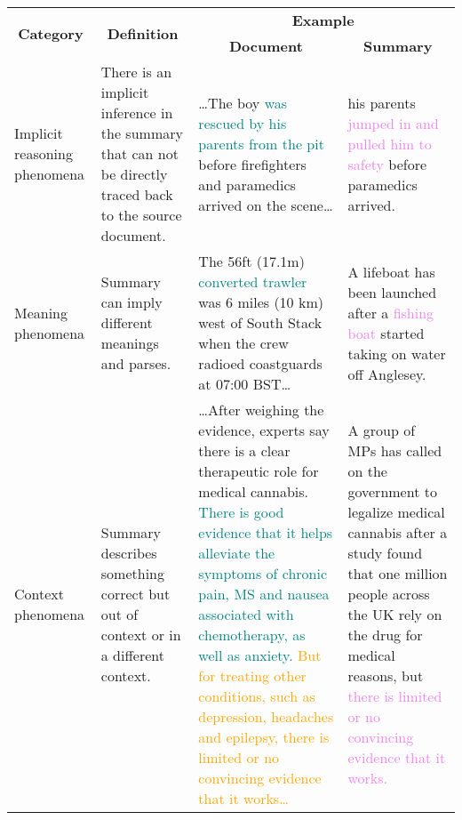\begin{table*}
\small
\centering
\begin{tabular}{@{}p{2.1cm}p{3cm}p{5.8cm}p{3.5cm}@{}}
\toprule
\multicolumn{1}{c}{\multirow{2}{*}{\textbf{Category}}} & \multicolumn{1}{c}{\multirow{2}{*}{\textbf{Definition}}}                                                   & \multicolumn{2}{c}{\textbf{Example}}    
\\
\cmidrule{3-4}
\multicolumn{1}{c}{}                                   & \multicolumn{1}{c}{}                                                                                       & \multicolumn{1}{c}{\textbf{Document}} & \multicolumn{1}{c}{\textbf{Summary}} \\
\midrule
Implicit reasoning phenomena                           & There is an implicit inference in the summary that can not be directly traced back to the source document. &          …The boy \textcolor{teal}{was rescued by his parents from the pit} before firefighters and paramedics arrived on the scene…
                             &                            his parents \textcolor{violet}{jumped in and pulled him to safety} before paramedics arrived.
          \\
\midrule
Meaning phenomena                                      & Summary can imply different meanings and parses.                                                           &             The 56ft (17.1m) \textcolor{teal}{converted trawler} was 6 miles (10 km) west of South Stack when the crew radioed coastguards at 07:00 BST…
                          &                   A lifeboat has been launched after a \textcolor{violet}{fishing boat} started taking on water off Anglesey.
                   \\
\midrule
Context phenomena                                      & Summary describes something correct but out of context or in a different context.                                            &              …After weighing the evidence, experts say there is a clear therapeutic role for medical cannabis. \textcolor{teal}{There is good evidence that it helps alleviate the symptoms of chronic pain, MS and nausea associated with chemotherapy, as well as anxiety.} \textcolor{orange}{But for treating other conditions, such as depression, headaches and epilepsy, there is limited or no convincing evidence that it works…}
                         &             A group of MPs has called on the government to legalize medical cannabis after a study found that one million people across the UK rely on the drug for medical reasons, but \textcolor{violet}{there is limited or no convincing evidence that it works.}     

\end{tabular}
\end{table*}
